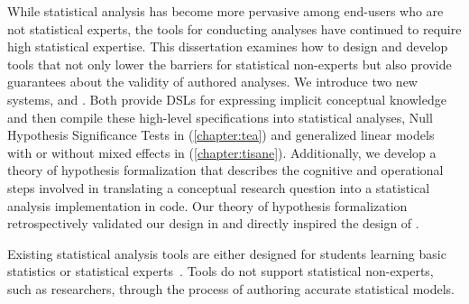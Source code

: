 
While statistical analysis has become more pervasive among end-users who are not
statistical experts, the tools for conducting analyses have continued to require
high statistical expertise. This dissertation examines how to design and develop
tools that not only lower the barriers for statistical non-experts but also
provide guarantees about the validity of authored analyses. We introduce two new
systems, \tea and \tisane. Both provide DSLs for expressing implicit conceptual
knowledge and then compile these high-level specifications into statistical
analyses, Null Hypothesis Significance Tests in \tea (\autoref{chapter:tea}) and
generalized linear models with or without mixed effects in \tisane
(\autoref{chapter:tisane}). 
Additionally, we develop a theory of hypothesis formalization that describes the
cognitive and operational steps involved in translating a conceptual research
question into a statistical analysis implementation in code. Our theory of
hypothesis formalization retrospectively validated our design in \tea and
directly inspired the design of \tisane. 


Existing statistical analysis tools are either designed for students learning
basic statistics or statistical experts~\cite{mcnamara2015bridging}.
Tools do
not support statistical non-experts, such as researchers, through the process of
authoring accurate statistical models. 

